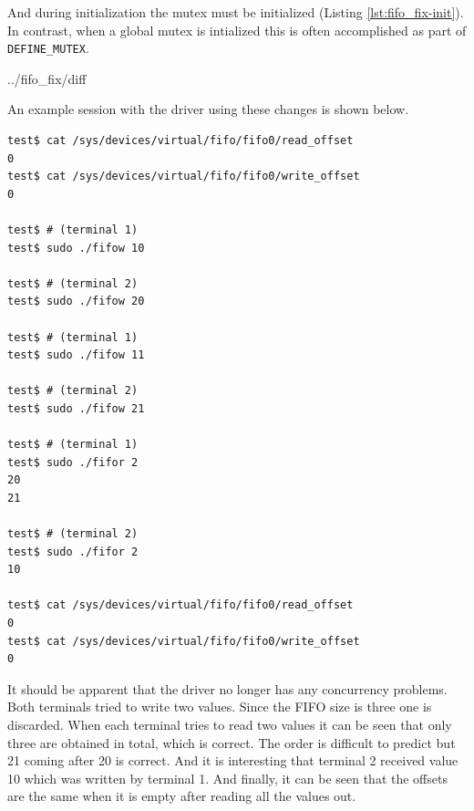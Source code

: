 \documentclass{article}
\begin{document}
And during initialization the mutex must be initialized
(Listing \ref{lst:fifo_fix-init}).
In contrast, when a global mutex is intialized this is often
accomplished as part of \verb+DEFINE_MUTEX+.


	{../fifo_fix/diff}

\begin{samepage}
An example session with the driver using these changes is shown below.

\begin{verbatim}
test$ cat /sys/devices/virtual/fifo/fifo0/read_offset
0
test$ cat /sys/devices/virtual/fifo/fifo0/write_offset
0

test$ # (terminal 1)
test$ sudo ./fifow 10

test$ # (terminal 2)
test$ sudo ./fifow 20

test$ # (terminal 1)
test$ sudo ./fifow 11

test$ # (terminal 2)
test$ sudo ./fifow 21

test$ # (terminal 1)
test$ sudo ./fifor 2
20
21

test$ # (terminal 2)
test$ sudo ./fifor 2
10

test$ cat /sys/devices/virtual/fifo/fifo0/read_offset
0
test$ cat /sys/devices/virtual/fifo/fifo0/write_offset
0
\end{verbatim}

It should be apparent that the driver no longer has any concurrency
problems.
Both terminals tried to write two values.
Since the FIFO size is three one is discarded.
When each terminal tries to read two values it can be seen that only
three are obtained in total, which is correct.
The order is difficult to predict but 21 coming after 20 is correct.
And it is interesting that terminal 2 received value 10 which was
written by terminal 1.
And finally, it can be seen that the offsets are the same when
it is empty after reading all the values out.


\end{samepage}

\pagebreak
\printbibliography

\end{document}
